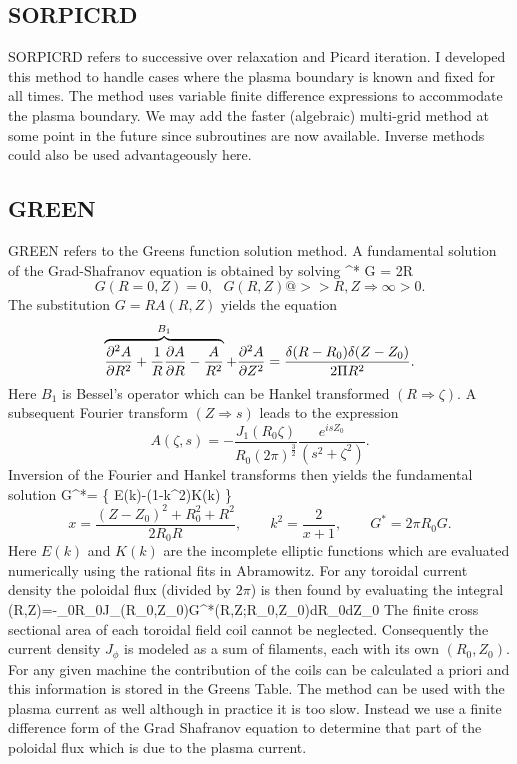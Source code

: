 \subsection{SORPICRD}
SORPICRD refers to successive over relaxation and Picard iteration. I developed
this method to handle cases where the plasma boundary is known and fixed for all
times. The method uses variable finite difference expressions to accommodate the
plasma boundary. We may add the faster (algebraic) multi-grid method at some
point in the future since subroutines are now available. Inverse methods could
also be used advantageously here.

\subsection{GREEN}
GREEN refers to the Greens function solution method.  A fundamental solution of
the Grad-Shafranov equation is obtained  by solving
\beq
 \nabla ^* G = {2\Pi R} \label{eeq}
\eeq
\begin{equation*}
 G(R=0,Z)=0,\ \ \  G(R,Z) @>>{R,Z \Rightarrow \infty}> 0.
\end{equation*}
The substitution $ G=RA(R,Z)$ yields the equation
\[  
 \overbrace{\frac{\partial^2 A}{\partial{ R^2}}+\frac{1}{R}\frac{\partial{ A}}{\partial{ R}} 
  -\frac{A}{R^2}  }^{B_1}
 +\frac{\partial^2 A}{\partial{ Z^2}}
 =\frac{\delta (R-R_0) \delta(Z-Z_0)}{2\Pi R^2} .
\]
Here $B_1$ is Bessel's operator which can be Hankel transformed 
$(R\Rightarrow \zeta)$. A subsequent Fourier transform $(Z \Rightarrow s)$ 
leads to the expression
\[
 A(\zeta,s) = -\frac{J_1(R_0\zeta)}{R_0 (2\pi)^{\frac{3}{2}}} 
  \frac{e^{isZ_0}}{(s^2+\zeta^2)}.
\]
Inversion of the Fourier and Hankel transforms then yields the fundamental
solution
\beq
 G^*=
 \left\{ E(k)-(1-k^2)K(k) \right\}
\eeq
\[
 x=\frac{(Z-Z_0)^2+R_0^2+R^2}{2R_0R}, \qquad
 k^2=\frac{2}{x+1},\qquad G^*=2\pi R_0G.
\]
Here $E(k) $ and $K(k)$ are the incomplete  elliptic functions which are
evaluated numerically using the rational fits in Abramowitz\cite{Abramowitz}.
For any toroidal current density the poloidal flux (divided by $ 2\pi $) is then
found by evaluating  the integral
\beq
 \Psi(R,Z)=-\mu_0\int R_0J_\phi(R_0,Z_0)G^*(R,Z;R_0,Z_0)dR_0dZ_0
\eeq
The finite cross sectional area of  each toroidal field coil cannot be
neglected. Consequently the  current density $J_\phi $ is modeled as a sum of
filaments, each with its own $(R_0,Z_0)$. For any given machine the
contribution of the coils can be calculated a priori and this information is
stored in the Greens Table.  The method can be used with the plasma current as
well although in practice it is too slow. Instead we use a finite difference
form of the Grad Shafranov equation to determine that part of the poloidal flux
which is due to the plasma current.  

